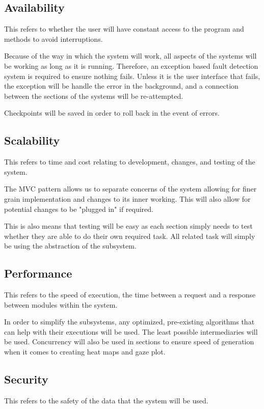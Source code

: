 \subsection{Availability}
This refers to whether the user will have constant access to the program and methods to avoid interruptions.

Because of the way in which the system will work, all aspects of the systems will be working as long as it is running. Therefore, an exception based fault detection system is required to ensure nothing fails. Unless it is the user interface that fails, the exception will be handle the error in the background, and a connection between the sections of the systems will be re-attempted.

Checkpoints will be saved in order to roll back in the event of errors.

\subsection{Scalability}
This refers to time and cost relating to development, changes, and testing of the system.

The MVC pattern allows us to separate concerns of the system allowing for finer grain implementation and changes to its inner working. This will also allow for potential changes to be "plugged in" if required.

This is also means that testing will be easy as each section simply needs to test whether they are able to do their own required task. All related task will simply be using the abstraction of the subsystem.

\subsection{Performance}
This refers to the speed of execution, the time between a request and a response between modules within the system.

In order to simplify the subsystems, any optimized, pre-existing algorithms that can help with their executions will be used. The least possible intermediaries will be used. Concurrency will also be used in sections to ensure speed of generation when it comes to creating heat maps and gaze plot.
\iffalse
\subsection{Security}
This refers to the safety of the data that the system will be used.


